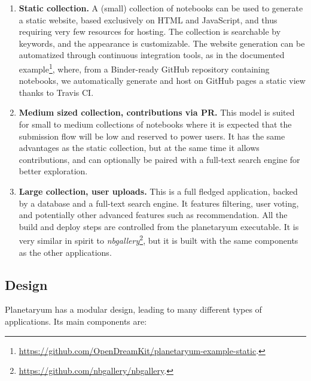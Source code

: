\begin{enumerate}
\item
  \textbf{Static collection.} A (small) collection of notebooks can be
  used to generate a static website, based exclusively on HTML and
  JavaScript, and thus requiring very few resources for hosting. The
  collection is searchable by keywords, and the appearance is
  customizable. The website generation can be automatized through
  continuous integration tools, as in the documented example\footnote{\url{https://github.com/OpenDreamKit/planetaryum-example-static}.},
  where, from a Binder-ready GitHub repository containing notebooks, we
  automatically generate and host on GitHub pages a static view thanks
  to Travis CI.
\item
  \textbf{Medium sized collection, contributions via PR.} This model is
  suited for small to medium collections of notebooks where it is
  expected that the submission flow will be low and reserved to power
  users. It has the same advantages as the static collection, but at the
  same time it allows contributions, and can optionally be paired with a
  full-text search engine for better exploration.
\item
  \textbf{Large collection, user uploads.} This is a full fledged
  application, backed by a database and a full-text search engine. It
  features filtering, user voting, and potentially other advanced
  features such as recommendation. All the build and deploy steps are
  controlled from the planetaryum executable. It is very similar in
  spirit to \emph{nbgallery}\footnote{\url{https://github.com/nbgallery/nbgallery}.},
  but it is built with the same components as the other applications.
\end{enumerate}

\subsection{Design}\label{design}

Planetaryum has a modular design, leading to many different types of
applications. Its main components are:

